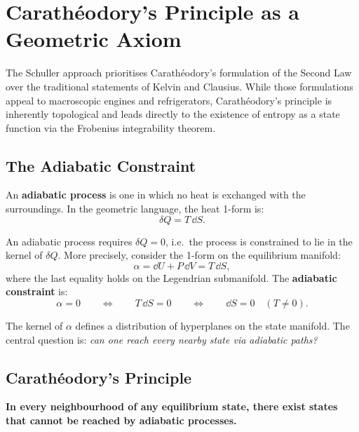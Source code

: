 \chapter{Carath\'eodory's Principle as a Geometric Axiom}

The Schuller approach prioritises Carath\'eodory's formulation of the Second Law over the traditional statements of Kelvin and Clausius. While those formulations appeal to macroscopic engines and refrigerators, Carath\'eodory's principle is inherently topological and leads directly to the existence of entropy as a state function via the Frobenius integrability theorem.

\section{The Adiabatic Constraint}

An \textbf{adiabatic process} is one in which no heat is exchanged with the surroundings. In the geometric language, the heat 1-form is:
\begin{equation}
\delta Q = T\,\dd S.
\end{equation}

An adiabatic process requires $\delta Q = 0$, i.e.\ the process is constrained to lie in the kernel of $\delta Q$. More precisely, consider the 1-form on the equilibrium manifold:
\begin{equation}
\alpha = \dd U + P\,\dd V = T\,\dd S,
\end{equation}
where the last equality holds on the Legendrian submanifold. The \textbf{adiabatic constraint} is:
\begin{equation}
\alpha = 0 \qquad \Longleftrightarrow \qquad T\,\dd S = 0 \qquad \Longleftrightarrow \qquad \dd S = 0 \quad (T \neq 0).
\end{equation}

The kernel of $\alpha$ defines a distribution of hyperplanes on the state manifold. The central question is: \emph{can one reach every nearby state via adiabatic paths?}

\section{Carath\'eodory's Principle}

\begin{definition}
\textbf{In every neighbourhood of any equilibrium state, there exist states that cannot be reached by adiabatic processes.}
\end{definition}

